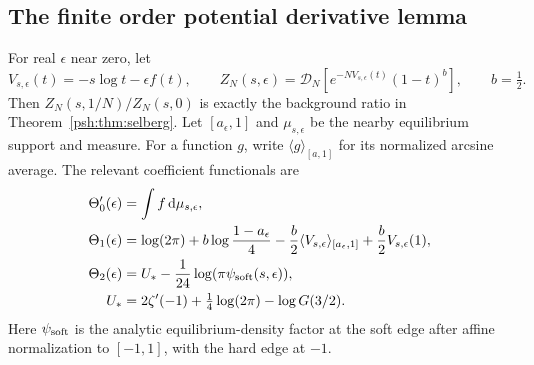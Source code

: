 \documentclass[11pt,a4paper]{article}
\numberwithin{equation}{section}
\theoremstyle{remark}\newtheorem{remark}[theorem]{Remark}
\newcommand{\dd}{\,\mathrm d}
\newcommand{\Dcal}{\mathcal D}
\begin{document}
\subsection{The finite order potential derivative lemma}\label{psh:sec:derivative}
For real $\epsilon$ near zero, let
\[
 V_{s,\epsilon}(t)=-s\log t-\epsilon f(t),\qquad
 Z_N(s,\epsilon)=\Dcal_N[e^{-NV_{s,\epsilon}(t)}(1-t)^b],
 \qquad b=\tfrac12.
\]
Then $Z_N(s,1/N)/Z_N(s,0)$ is exactly the background ratio in
Theorem~\ref{psh:thm:selberg}. Let $[a_\epsilon,1]$ and
$\mu_{s,\epsilon}$ be the nearby equilibrium support and measure.
For a function $g$, write $\langle g\rangle_{[a,1]}$ for its normalized
arcsine average. The relevant coefficient functionals are
\begin{align}
 \Theta_0'(\epsilon)&=\int f\dd\mu_{s,\epsilon},\label{psh:eq:E0prime}\\
 \Theta_1(\epsilon)&=\log(2\pi)+b\log\frac{1-a_\epsilon}{4}
      -\frac b2\langle V_{s,\epsilon}\rangle_{[a_\epsilon,1]}
      +\frac b2V_{s,\epsilon}(1),\label{psh:eq:E1}\\
 \Theta_2(\epsilon)&=U_*-\frac1{24}\log(\pi\psi_{\rm soft}(s,\epsilon)),
 \label{psh:eq:E2}\\
 U_*&=2\zeta'(-1)+\tfrac14\log(2\pi)-\log G(3/2).\notag
\end{align}
Here $\psi_{\rm soft}$ is the analytic equilibrium-density factor at the
soft edge after affine normalization to $[-1,1]$, with the hard edge
at $-1$.
\end{document}
